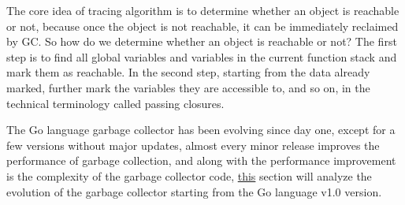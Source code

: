 \documentclass[a4paper]{article}
\theoremstyle{definition}
\begin{document}
The core idea of tracing algorithm is to determine whether an object is reachable or not, because once the object is not reachable, it can be immediately reclaimed by GC. So how do we determine whether an object is reachable or not? The first step is to find all global variables and variables in the current function stack and mark them as reachable. In the second step, starting from the data already marked, further mark the variables they are accessible to, and so on, in the technical terminology called passing closures.

The Go language garbage collector has been evolving since day one, except for a few versions without major updates, almost every minor release improves the performance of garbage collection, and along with the performance improvement is the complexity of the garbage collector code, \href{https://draveness.me/golang/docs/part3-runtime/ch07-memory/golang-garbage-collector/}{this} section will analyze the evolution of the garbage collector starting from the Go language v1.0 version.
\end{document}
